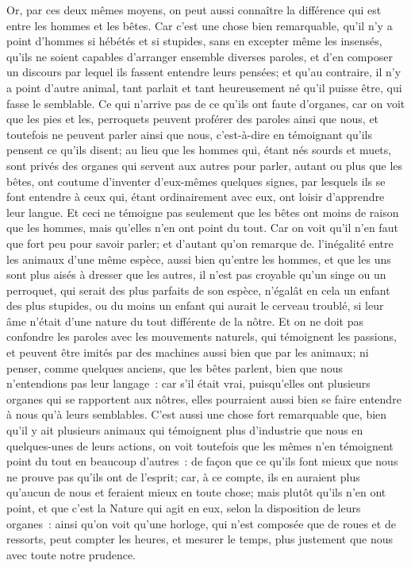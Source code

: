 \documentclass[french,twoside]{book} %
\begin{document}
Or, par ces deux mêmes moyens, on peut aussi connaître la différence qui est entre les hommes et les bêtes. Car c'est une chose bien remarquable, qu'il n'y a point d'hommes si hébétés et si stupides, sans en excepter même les insensés, qu'ils ne soient capables d'arranger ensemble diverses paroles, et d'en composer un discours par lequel ils fassent entendre leurs pensées; et qu'au contraire, il n'y a point d'autre animal, tant parlait et tant heureusement né qu'il puisse être, qui fasse le semblable. Ce qui n'arrive pas de ce qu'ils ont faute d'organes, car on voit que les pies et les, perroquets peuvent proférer des paroles ainsi que nous, et toutefois ne peuvent parler ainsi que nous, c'est-à-dire en témoignant qu'ils pensent ce qu'ils disent; au lieu que les hommes qui, étant nés sourds et muets, sont privés des organes qui servent aux autres pour parler, autant ou plus que les bêtes, ont coutume d'inventer d'eux-mêmes quelques signes, par lesquels ils se font entendre à ceux qui, étant ordinairement avec eux, ont loisir d'apprendre leur langue. Et ceci ne témoigne pas seulement que les bêtes ont moins de raison que les hommes, mais qu'elles n'en ont point du tout. Car on voit qu'il n'en faut que fort peu pour savoir parler; et d'autant qu'on remarque de. l'inégalité entre les animaux d'une même espèce, aussi bien qu'entre les hommes, et que les uns sont plus aisés à dresser que les autres, il n'est pas croyable qu'un singe ou un perroquet, qui serait des plus parfaits de son espèce, n'égalât en cela un enfant des plus stupides, ou du moins un enfant qui aurait le cerveau troublé, si leur âme n'était d'une nature du tout différente de la nôtre. Et on ne doit pas confondre les paroles avec les mouvements naturels, qui témoignent les passions, et peuvent être imités par des machines aussi bien que par les animaux; ni penser, comme quelques anciens, que les bêtes parlent, bien que nous n'entendions pas leur langage : car s'il était vrai, puisqu'elles ont plusieurs organes qui se rapportent aux nôtres, elles pourraient aussi bien se faire entendre à nous qu'à leurs semblables. C'est aussi une chose fort remarquable que, bien qu'il y ait plusieurs animaux qui témoignent plus d'industrie que nous en quelques-unes de leurs actions, on voit toutefois que les mêmes n'en témoignent point du tout en beaucoup d'autres : de façon que ce qu'ils font mieux que nous ne prouve pas qu'ils ont de l'esprit; car, à ce compte, ils en auraient plus qu'aucun de nous et feraient mieux en toute chose; mais plutôt qu'ils n'en ont point, et que c'est la Nature qui agit en eux, selon la disposition de leurs organes : ainsi qu'on voit qu'une horloge, qui n'est composée que de roues et de ressorts, peut compter les heures, et mesurer le temps, plus justement que nous avec toute notre prudence.\par
\end{document}
